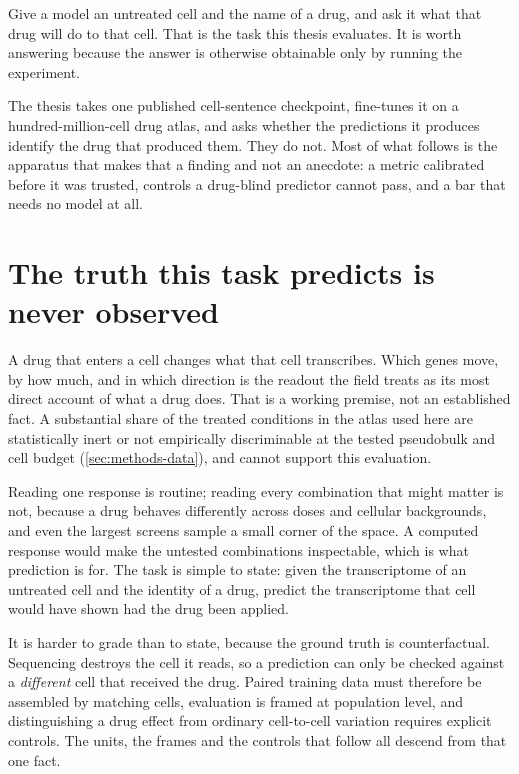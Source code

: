 \noindent
Give a model an untreated cell and the name of a drug, and ask it what that
drug will do to that cell. That is the task this thesis evaluates. It is worth
answering because the answer is otherwise obtainable only by running the
experiment.

The thesis takes one published cell-sentence checkpoint, fine-tunes it on a
hundred-million-cell drug atlas, and asks whether the predictions it produces
identify the drug that produced them. They do not. Most of what follows is the
apparatus that makes that a finding and not an anecdote: a metric calibrated
before it was trusted, controls a drug-blind predictor cannot pass, and a bar
that needs no model at all.

\section{The truth this task predicts is never observed}
\label{sec:intro-task}

A drug that enters a cell changes what that cell transcribes. Which genes move,
by how much, and in which direction is the readout the field treats as its most
direct account of what a drug does. That is a working premise, not an
established fact. A substantial share of the treated conditions in the atlas
used here are statistically inert or not empirically discriminable at the tested
pseudobulk and cell budget (\cref{sec:methods-data}), and cannot support this
evaluation.

Reading one response is routine; reading every combination that might matter is
not, because a drug behaves differently across doses and cellular backgrounds,
and even the largest screens sample a small corner of the space. A computed
response would make the untested combinations inspectable, which is what
prediction is for. The task is simple to state: given the transcriptome of an
untreated cell and the identity of a drug, predict the transcriptome that cell
would have shown had the drug been applied.

It is harder to grade than to state, because the ground truth is
counterfactual. Sequencing destroys the cell it reads, so a prediction can only
be checked against a \emph{different} cell that received the drug. Paired
training data must therefore be assembled by matching cells, evaluation is
framed at population level, and distinguishing a drug effect from ordinary
cell-to-cell variation requires explicit controls. The units, the frames and
the controls that follow all descend from that one fact.

